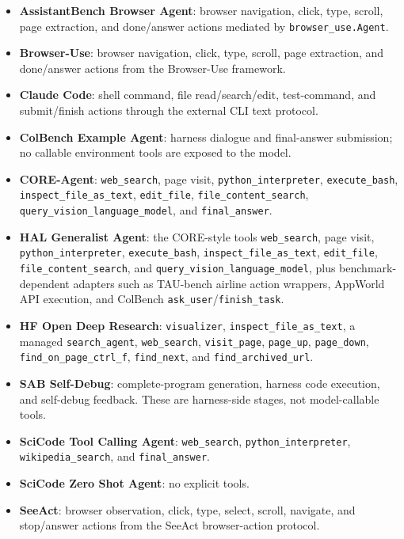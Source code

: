 \begingroup
\footnotesize
\begin{itemize}
\item \textbf{AssistantBench Browser Agent}: browser navigation, click, type,
scroll, page extraction, and done/answer actions mediated by
\texttt{browser\_use.Agent}.
\item \textbf{Browser-Use}: browser navigation, click, type, scroll, page
extraction, and done/answer actions from the Browser-Use framework.
\item \textbf{Claude Code}: shell command, file read/search/edit, test-command,
and submit/finish actions through the external CLI text protocol.
\item \textbf{ColBench Example Agent}: harness dialogue and final-answer
submission; no callable environment tools are exposed to the model.
\item \textbf{CORE-Agent}: \texttt{web\_search}, page visit,
\texttt{python\_interpreter}, \texttt{execute\_bash},
\texttt{inspect\_file\_as\_text}, \texttt{edit\_file},
\texttt{file\_content\_search}, \texttt{query\_vision\_language\_model}, and
\texttt{final\_answer}.
\item \textbf{HAL Generalist Agent}: the CORE-style tools
\texttt{web\_search}, page visit, \texttt{python\_interpreter},
\texttt{execute\_bash}, \texttt{inspect\_file\_as\_text}, \texttt{edit\_file},
\texttt{file\_content\_search}, and \texttt{query\_vision\_language\_model},
plus benchmark-dependent adapters such as TAU-bench airline action wrappers,
AppWorld API execution, and ColBench \texttt{ask\_user}/\texttt{finish\_task}.
\item \textbf{HF Open Deep Research}: \texttt{visualizer},
\texttt{inspect\_file\_as\_text}, a managed \texttt{search\_agent},
\texttt{web\_search}, \texttt{visit\_page}, \texttt{page\_up},
\texttt{page\_down}, \texttt{find\_on\_page\_ctrl\_f},
\texttt{find\_next}, and \texttt{find\_archived\_url}.
\item \textbf{SAB Self-Debug}: complete-program generation, harness code
execution, and self-debug feedback. These are harness-side stages, not
model-callable tools.
\item \textbf{SciCode Tool Calling Agent}: \texttt{web\_search},
\texttt{python\_interpreter}, \texttt{wikipedia\_search}, and
\texttt{final\_answer}.
\item \textbf{SciCode Zero Shot Agent}: no explicit tools.
\item \textbf{SeeAct}: browser observation, click, type, select, scroll,
navigate, and stop/answer actions from the SeeAct browser-action protocol.

\end{itemize}
